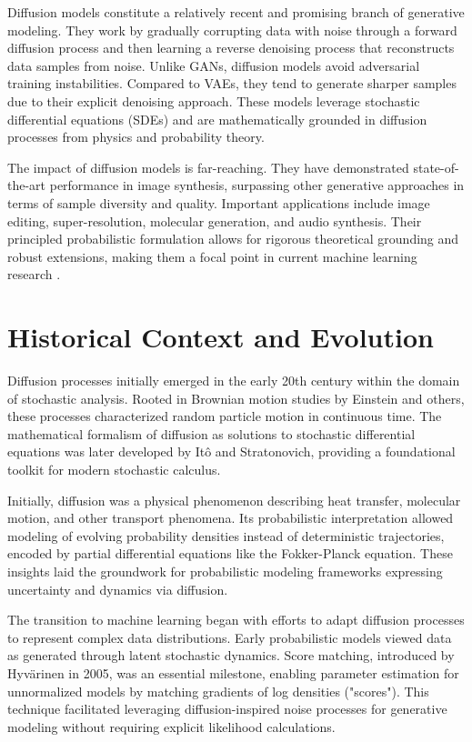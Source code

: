 \documentclass[a4paper,12pt,oneside]{memoir}
\begin{document}
Diffusion models constitute a relatively recent and promising branch of generative modeling. They work by gradually corrupting data with noise through a forward diffusion process and then learning a reverse denoising process that reconstructs data samples from noise. Unlike GANs, diffusion models avoid adversarial training instabilities. Compared to VAEs, they tend to generate sharper samples due to their explicit denoising approach. These models leverage stochastic differential equations (SDEs) and are mathematically grounded in diffusion processes from physics and probability theory.

The impact of diffusion models is far-reaching. They have demonstrated state-of-the-art performance in image synthesis, surpassing other generative approaches in terms of sample diversity and quality. Important applications include image editing, super-resolution, molecular generation, and audio synthesis. Their principled probabilistic formulation allows for rigorous theoretical grounding and robust extensions, making them a focal point in current machine learning research \cite{Song2021}.

\section{Historical Context and Evolution}

Diffusion processes initially emerged in the early 20th century within the domain of stochastic analysis. Rooted in Brownian motion studies by Einstein and others, these processes characterized random particle motion in continuous time. The mathematical formalism of diffusion as solutions to stochastic differential equations was later developed by Itô and Stratonovich, providing a foundational toolkit for modern stochastic calculus.

Initially, diffusion was a physical phenomenon describing heat transfer, molecular motion, and other transport phenomena. Its probabilistic interpretation allowed modeling of evolving probability densities instead of deterministic trajectories, encoded by partial differential equations like the Fokker-Planck equation. These insights laid the groundwork for probabilistic modeling frameworks expressing uncertainty and dynamics via diffusion.

The transition to machine learning began with efforts to adapt diffusion processes to represent complex data distributions. Early probabilistic models viewed data as generated through latent stochastic dynamics. Score matching, introduced by Hyvärinen in 2005, was an essential milestone, enabling parameter estimation for unnormalized models by matching gradients of log densities ("scores"). This technique facilitated leveraging diffusion-inspired noise processes for generative modeling without requiring explicit likelihood calculations.
\end{document}
